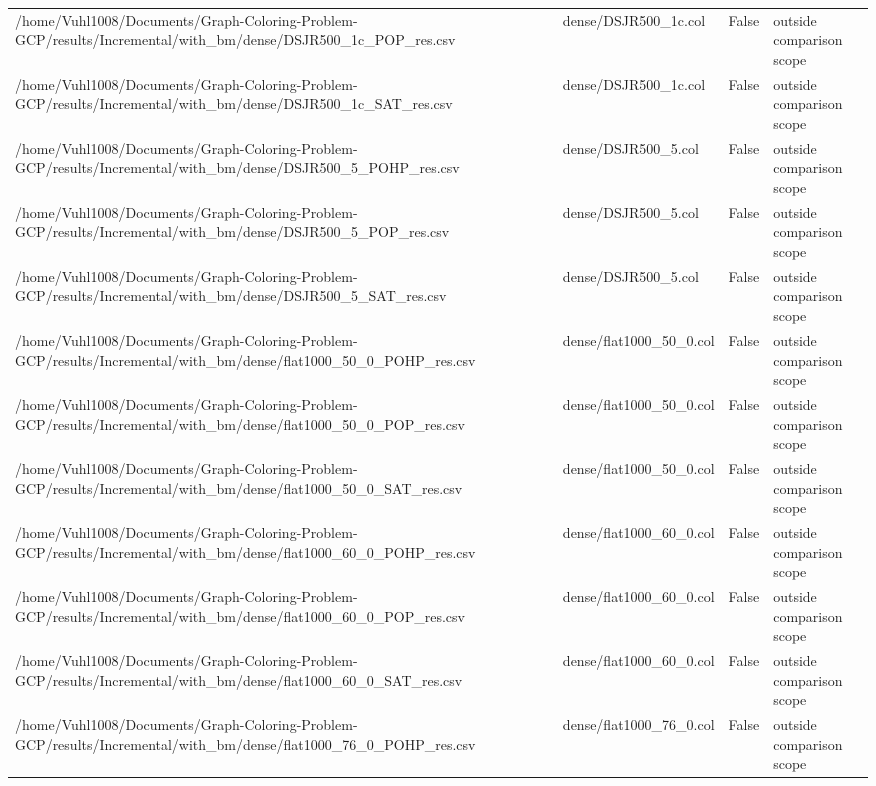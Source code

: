 \begin{table}[htbp]
\begin{tabular}{llll}
/home/Vuhl1008/Documents/Graph-Coloring-Problem-GCP/results/Incremental/with\_bm/dense/DSJR500\_1c\_POP\_res.csv & dense/DSJR500\_1c.col & False & outside comparison scope \\
/home/Vuhl1008/Documents/Graph-Coloring-Problem-GCP/results/Incremental/with\_bm/dense/DSJR500\_1c\_SAT\_res.csv & dense/DSJR500\_1c.col & False & outside comparison scope \\
/home/Vuhl1008/Documents/Graph-Coloring-Problem-GCP/results/Incremental/with\_bm/dense/DSJR500\_5\_POHP\_res.csv & dense/DSJR500\_5.col & False & outside comparison scope \\
/home/Vuhl1008/Documents/Graph-Coloring-Problem-GCP/results/Incremental/with\_bm/dense/DSJR500\_5\_POP\_res.csv & dense/DSJR500\_5.col & False & outside comparison scope \\
/home/Vuhl1008/Documents/Graph-Coloring-Problem-GCP/results/Incremental/with\_bm/dense/DSJR500\_5\_SAT\_res.csv & dense/DSJR500\_5.col & False & outside comparison scope \\
/home/Vuhl1008/Documents/Graph-Coloring-Problem-GCP/results/Incremental/with\_bm/dense/flat1000\_50\_0\_POHP\_res.csv & dense/flat1000\_50\_0.col & False & outside comparison scope \\
/home/Vuhl1008/Documents/Graph-Coloring-Problem-GCP/results/Incremental/with\_bm/dense/flat1000\_50\_0\_POP\_res.csv & dense/flat1000\_50\_0.col & False & outside comparison scope \\
/home/Vuhl1008/Documents/Graph-Coloring-Problem-GCP/results/Incremental/with\_bm/dense/flat1000\_50\_0\_SAT\_res.csv & dense/flat1000\_50\_0.col & False & outside comparison scope \\
/home/Vuhl1008/Documents/Graph-Coloring-Problem-GCP/results/Incremental/with\_bm/dense/flat1000\_60\_0\_POHP\_res.csv & dense/flat1000\_60\_0.col & False & outside comparison scope \\
/home/Vuhl1008/Documents/Graph-Coloring-Problem-GCP/results/Incremental/with\_bm/dense/flat1000\_60\_0\_POP\_res.csv & dense/flat1000\_60\_0.col & False & outside comparison scope \\
/home/Vuhl1008/Documents/Graph-Coloring-Problem-GCP/results/Incremental/with\_bm/dense/flat1000\_60\_0\_SAT\_res.csv & dense/flat1000\_60\_0.col & False & outside comparison scope \\
/home/Vuhl1008/Documents/Graph-Coloring-Problem-GCP/results/Incremental/with\_bm/dense/flat1000\_76\_0\_POHP\_res.csv & dense/flat1000\_76\_0.col & False & outside comparison scope \\

\end{tabular}
\end{table}
